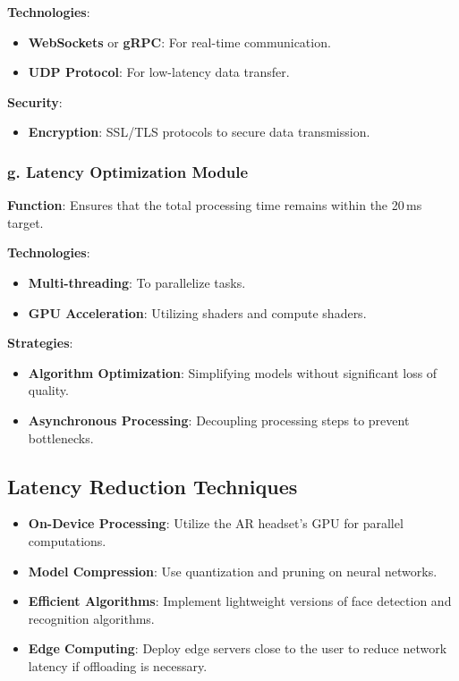 \documentclass{article}
\begin{document}
\textbf{Technologies}:
\begin{itemize}
    \item \textbf{WebSockets} or \textbf{gRPC}: For real-time communication.
    \item \textbf{UDP Protocol}: For low-latency data transfer.
\end{itemize}

\textbf{Security}:
\begin{itemize}
    \item \textbf{Encryption}: SSL/TLS protocols to secure data transmission.
\end{itemize}

\subsubsection{g. Latency Optimization Module}

\textbf{Function}: Ensures that the total processing time remains within the 20\,ms target.

\textbf{Technologies}:
\begin{itemize}
    \item \textbf{Multi-threading}: To parallelize tasks.
    \item \textbf{GPU Acceleration}: Utilizing shaders and compute shaders.
\end{itemize}

\textbf{Strategies}:
\begin{itemize}
    \item \textbf{Algorithm Optimization}: Simplifying models without significant loss of quality.
    \item \textbf{Asynchronous Processing}: Decoupling processing steps to prevent bottlenecks.
\end{itemize}

\subsection{Latency Reduction Techniques}

\begin{itemize}
    \item \textbf{On-Device Processing}: Utilize the AR headset's GPU for parallel computations.
    \item \textbf{Model Compression}: Use quantization and pruning on neural networks.
    \item \textbf{Efficient Algorithms}: Implement lightweight versions of face detection and recognition algorithms.
    \item \textbf{Edge Computing}: Deploy edge servers close to the user to reduce network latency if offloading is necessary.
\end{itemize}
\end{document}
